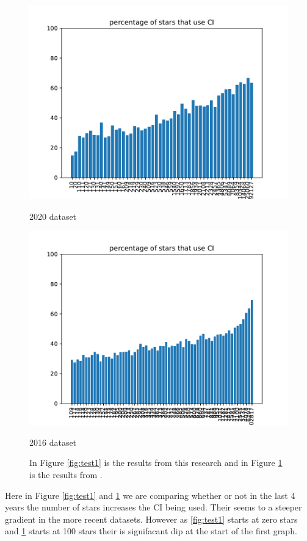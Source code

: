 \documentclass[twoside,12pt,titlepage,a4paper]{article}
\begin{document}
\begin{figure}[!htbp]
  \centering
  \begin{minipage}{.48\textwidth}
    \centering
    \includegraphics[width=.9\textwidth]{../src/results/percentage stars with CI.pdf}
    \caption{2020 dataset}
    \label{fig:test1}
  \end{minipage}%
  \hfill
  \begin{minipage}{.48\textwidth}
    \centering
    \includegraphics[width=.9\textwidth]{../src/results/percentage sub with CI other paper source.pdf}
    \caption[]{2016 dataset}
    \label{fig:test2}
  \end{minipage}
  \caption{In Figure \ref{fig:test1} is the results from this research and in Figure \ref{fig:test2} is the results from \cite{Hilton2016}.
  }
\end{figure}

Here in Figure \ref{fig:test1} and \ref{fig:test2} we are comparing whether or not in the last 4 years the number of stars increases the CI being used. Their seems to a steeper gradient in the more recent datasets. However as \ref{fig:test1} starts at zero stars and \ref{fig:test2} starts at 100 stars their is signifacant dip at the start of the first graph.
\end{document}
